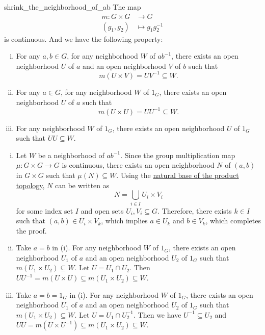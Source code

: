 \documentclass{report}
\begin{document}
\begin{lemma}{}{shrink_the_neighborhood_of_ab}
	The map 
	\begin{align*}
		m:G\times G & \longrightarrow G       \\
		(g_1,g_2)   & \longmapsto g_1g_2^{-1}
	\end{align*}
	is continuous. And we have the following property:
	\begin{enumerate}[(i)]
		\item For any $a ,b\in G$, for any neighborhood $W$ of $ab^{-1}$, there exists an open neighborhood $U$ of $a$ and an open neighborhood $V$ of $b$ such that 
		\[
		m(U\times V)=U V^{-1}\subseteq W.
		\]
		\item For any $a \in G$, for any neighborhood $W$ of $1_G$, there exists an open neighborhood $U$ of $a$ such that 
		\[
		m(U\times U)=U U^{-1}\subseteq W.
		\]
		\item For any neighborhood $W$ of $1_G$, there exists an open neighborhood $U$ of $1_G$ such that $UU\subseteq W$.
	\end{enumerate}
\end{lemma}
\begin{prf}
	\begin{enumerate}[(i)]
		\item Let $W$ be a neighborhood of $ab^{-1}$. Since the group multiplication map $\mu:G\times G\to G$ is continuous, there exists an open neighborhood $N$ of $(a,b)$ in $G\times G$ such that $\mu(N)\subseteq W$. Using the \hyperref[th:basis_of_product_topology]{natural base of the product topology}, $N$ can be written as 
	\[
	N=\bigcup_{i\in I} U_i\times V_i
	\]
	for some index set $I$ and open sets $U_i, V_i\subseteq G$. Therefore, there exists $k\in I$ such that $(a,b)\in U_i\times V_k$, which implies $a\in U_k$ and $b\in V_k$, which completes the proof.
	\item Take $a=b$ in (i). For any neighborhood $W$ of $1_G$, there exists an open neighborhood $U_1$ of $a$ and an open neighborhood $U_2$ of $1_G$ such that $m(U_1\times U_2)\subseteq W$. Let $U=U_1\cap U_2$. Then $UU^{-1}= m(U\times U)\subseteq m(U_1\times U_2)\subseteq W$.
	\item Take $a=b=1_G$ in (i). For any neighborhood $W$ of $1_G$, there exists an open neighborhood $U_1$ of $a$ and an open neighborhood $U_2$ of $1_G$ such that $m(U_1\times U_2)\subseteq W$. Let $U=U_1\cap U_2^{-1}$. Then we have $U^{-1}\subseteq U_2$ and $UU= m(U\times U^{-1})\subseteq m(U_1\times U_2)\subseteq W$.
\end{enumerate}
\end{prf}
\end{document}
